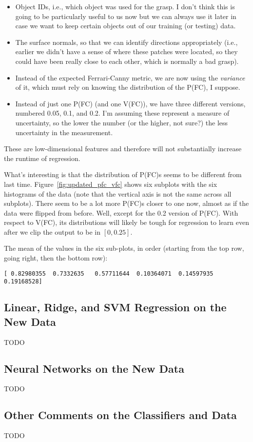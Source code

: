 \documentclass[a4paper, 11pt]{article}
\begin{document}
\begin{itemize}
    \item Object IDs, i.e., which object was used for the grasp. I don't think this is going to be
    particularly useful to us now but we can always use it later in case we want to keep certain
    objects out of our training (or testing) data.
    \item The surface normals, so that we can identify directions appropriately (i.e., earlier we
    didn't have a sense of where these patches were located, so they could have been really close to
    each other, which is normally a bad grasp).
    \item Instead of the expected Ferrari-Canny metric, we are now using the \emph{variance} of it,
    which must rely on knowing the distribution of the P(FC), I suppose.
    \item Instead of just one P(FC) (and one V(FC)), we have three different versions, numbered
    0.05, 0.1, and 0.2. I'm assuming these represent a measure of uncertainty, so the lower the
    number (or the higher, not sure?) the less uncertainty in the measurement.
\end{itemize}

These are low-dimensional features and therefore will not substantially increase the runtime of
regression.

What's interesting is that the distribution of P(FC)s seems to be different from last time.
Figure~\ref{fig:updated_pfc_vfc} shows six subplots with the six histograms of the data (note that
the vertical axis is not the same across all subplots). There seem to be a lot more P(FC)s closer to
one now, almost as if the data were flipped from before. Well, except for the 0.2 version of P(FC).
With respect to V(FC), its distributions will likely be tough for regression to learn even after we
clip the output to be in $[0,0.25]$.

The mean of the values in the six sub-plots, in order (starting from the top row, going right,
then the bottom row):

\begin{verbatim}
[ 0.82980355  0.7332635   0.57711644  0.10364071  0.14597935  0.19168528]
\end{verbatim}


\subsection{Linear, Ridge, and SVM Regression on the New Data}

TODO

\subsection{Neural Networks on the New Data}

TODO

\subsection{Other Comments on the Classifiers and Data}

TODO
\end{document}
